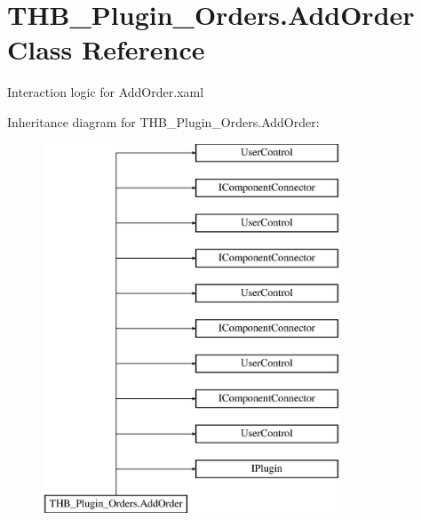 \hypertarget{class_t_h_b___plugin___orders_1_1_add_order}{}\section{T\+H\+B\+\_\+\+Plugin\+\_\+\+Orders.\+Add\+Order Class Reference}
\label{class_t_h_b___plugin___orders_1_1_add_order}


Interaction logic for Add\+Order.\+xaml  


Inheritance diagram for T\+H\+B\+\_\+\+Plugin\+\_\+\+Orders.\+Add\+Order\+:\begin{figure}[H]
\begin{center}
\leavevmode
\includegraphics[height=11.000000cm]{d4/d17/class_t_h_b___plugin___orders_1_1_add_order}
\end{center}
\end{figure}
